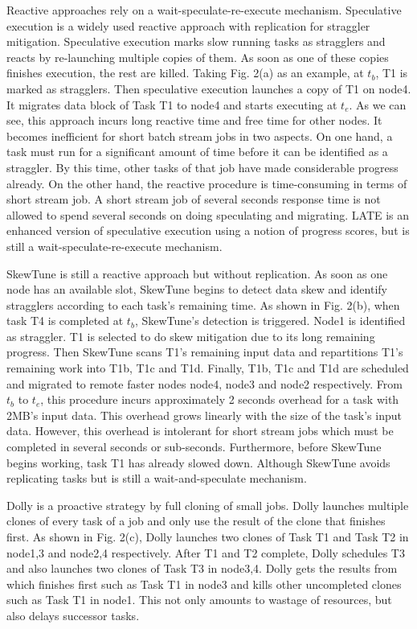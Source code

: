 \documentclass[10pt,conference,compsocconf,letterpaper]{IEEEtran}
\begin{document}
  Reactive approaches rely on a wait-speculate-re-execute mechanism. Speculative execution \cite{Dean2004} is a widely used reactive approach with replication for straggler mitigation. Speculative execution marks slow running tasks as stragglers and reacts by re-launching multiple copies of them. As soon as one of these copies finishes execution, the rest are killed. Taking Fig. 2(a) as an example, at $t_b$, T1 is marked as stragglers. Then speculative execution launches a copy of T1 on node4. It migrates data block of Task T1 to node4 and starts executing at $t_e$. As we can see, this approach incurs long reactive time and free time for other nodes. It becomes inefficient for short batch stream jobs in two aspects. On one hand, a task must run for a significant amount of time before it can be identified as a straggler. By this time, other tasks of that job have made considerable progress already. On the other hand, the reactive procedure is time-consuming in terms of short stream job. A short stream job of several seconds response time is not allowed to spend several seconds on doing speculating and migrating. LATE \cite{Zaharia2008} is an enhanced version of speculative execution using a notion of progress scores, but is still a wait-speculate-re-execute mechanism.

  SkewTune \cite{Kwon2012} is still a reactive approach but without replication. As soon as one node has an available slot, SkewTune begins to detect data skew and identify stragglers according to each task's remaining time. As shown in Fig. 2(b), when task T4 is completed at $t_b$, SkewTune's detection is triggered. Node1 is identified as straggler. T1 is selected to do skew mitigation due to its long remaining progress. Then SkewTune scans T1's remaining input data and repartitions T1's remaining work into T1b, T1c and T1d. Finally, T1b, T1c and T1d are scheduled and migrated to remote faster nodes node4, node3 and node2 respectively. From $t_b$ to $t_e$, this procedure incurs approximately 2 seconds overhead for a task with 2MB's input data. This overhead grows linearly with the size of the task's input data. However, this overhead is intolerant for short stream jobs which must be completed in several seconds or sub-seconds. Furthermore, before SkewTune begins working, task T1 has already slowed down. Although SkewTune avoids replicating tasks but is still a wait-and-speculate mechanism.

  Dolly \cite{Ananthanarayanan2013} is a proactive strategy by full cloning of small jobs. Dolly launches multiple clones of every task of a job and only use the result of the clone that finishes first. As shown in Fig. 2(c), Dolly launches two clones of Task T1 and Task T2 in node1,3 and node2,4 respectively. After T1 and T2 complete, Dolly schedules T3 and also launches two clones of Task T3 in node3,4. Dolly gets the results from which finishes first such as Task T1 in node3 and kills other uncompleted clones such as Task T1 in node1. This not only amounts to wastage of resources, but also delays successor tasks.
\end{document}

